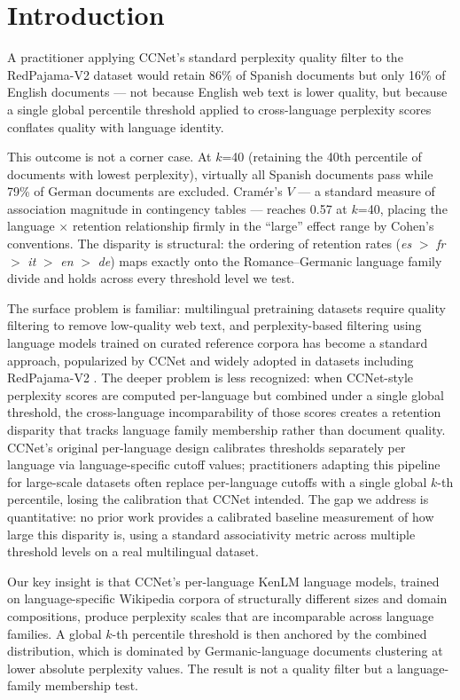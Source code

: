 \section{Introduction}

A practitioner applying CCNet's standard perplexity quality filter to the RedPajama-V2 dataset would retain 86\% of Spanish documents but only 16\% of English documents --- not because English web text is lower quality, but because a single global percentile threshold applied to cross-language perplexity scores conflates quality with language identity.

This outcome is not a corner case. At $k$=40 (retaining the 40th percentile of documents with lowest perplexity), virtually all Spanish documents pass while 79\% of German documents are excluded. Cram{\'e}r's $V$ --- a standard measure of association magnitude in contingency tables --- reaches 0.57 at $k$=40, placing the language $\times$ retention relationship firmly in the ``large'' effect range by Cohen's conventions. The disparity is structural: the ordering of retention rates (\textit{es} $>$ \textit{fr} $>$ \textit{it} $>$ \textit{en} $>$ \textit{de}) maps exactly onto the Romance--Germanic language family divide and holds across every threshold level we test.

The surface problem is familiar: multilingual pretraining datasets require quality filtering to remove low-quality web text, and perplexity-based filtering using language models trained on curated reference corpora has become a standard approach, popularized by CCNet \cite{Wenzek2019CCNet} and widely adopted in datasets including RedPajama-V2 \cite{Weber2024RedPajama}. The deeper problem is less recognized: when CCNet-style perplexity scores are computed per-language but combined under a single global threshold, the cross-language incomparability of those scores creates a retention disparity that tracks language family membership rather than document quality. CCNet's original per-language design calibrates thresholds separately per language via language-specific cutoff values; practitioners adapting this pipeline for large-scale datasets often replace per-language cutoffs with a single global $k$-th percentile, losing the calibration that CCNet intended. The gap we address is quantitative: no prior work provides a calibrated baseline measurement of how large this disparity is, using a standard associativity metric across multiple threshold levels on a real multilingual dataset.

Our key insight is that CCNet's per-language KenLM language models, trained on language-specific Wikipedia corpora of structurally different sizes and domain compositions, produce perplexity scales that are incomparable across language families. A global $k$-th percentile threshold is then anchored by the combined distribution, which is dominated by Germanic-language documents clustering at lower absolute perplexity values. The result is not a quality filter but a language-family membership test.

